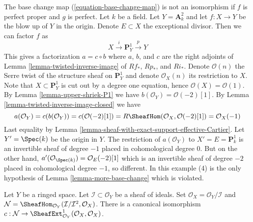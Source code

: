 \begin{example}
\label{example-base-change-wrong}
The base change map (\ref{equation-base-change-map}) is not an
isomorphism if $f$ is perfect proper and $g$ is perfect.
Let $k$ be a field. Let $Y = \mathbf{A}^2_k$ and let $f : X \to Y$
be the blow up of $Y$ in the origin. Denote $E \subset X$ the
exceptional divisor. Then we can factor $f$ as
$$
X \xrightarrow{i} \mathbf{P}^1_Y \xrightarrow{p} Y
$$
This gives a factorization $a = c \circ b$ where
$a$, $b$, and $c$ are the right adjoints of
Lemma \ref{lemma-twisted-inverse-image}
of $Rf_*$, $Rp_*$, and $Ri_*$. Denote $\mathcal{O}(n)$ the
Serre twist of the structure sheaf on $\mathbf{P}^1_Y$ and
denote $\mathcal{O}_X(n)$ its restriction to $X$.
Note that $X \subset \mathbf{P}^1_Y$ is cut out by
a degree one equation, hence $\mathcal{O}(X) = \mathcal{O}(1)$.
By Lemma \ref{lemma-upper-shriek-P1} we have
$b(\mathcal{O}_Y) = \mathcal{O}(-2)[1]$.
By Lemma \ref{lemma-twisted-inverse-image-closed}
we have
$$
a(\mathcal{O}_Y) = c(b(\mathcal{O}_Y)) =
c(\mathcal{O}(-2)[1]) =
R\SheafHom(\mathcal{O}_X, \mathcal{O}(-2)[1]) =
\mathcal{O}_X(-1)
$$
Last equality by Lemma \ref{lemma-sheaf-with-exact-support-effective-Cartier}.
Let $Y' = \Spec(k)$ be the origin in $Y$. The restriction of
$a(\mathcal{O}_Y)$ to $X' = E = \mathbf{P}^1_k$
is an invertible sheaf of degree $-1$ placed in cohomological
degree $0$. But on the other hand,
$a'(\mathcal{O}_{\Spec(k)}) = \mathcal{O}_E(-2)[1]$
which is an invertible sheaf of degree $-2$ placed in
cohomological degree $-1$, so different. In this example
(4) is the only hypothesis of Lemma \ref{lemma-more-base-change}
which is violated.
\end{example}

\begin{lemma}
\label{lemma-ext}
Let $Y$ be a ringed space. Let $\mathcal{I} \subset \mathcal{O}_Y$
be a sheaf of ideals. Set $\mathcal{O}_X = \mathcal{O}_Y/\mathcal{I}$ and
$\mathcal{N} =
\SheafHom_{\mathcal{O}_Y}(\mathcal{I}/\mathcal{I}^2, \mathcal{O}_X)$.
There is a canonical isomorphism
$c : \mathcal{N} \to
\SheafExt^1_{\mathcal{O}_Y}(\mathcal{O}_X, \mathcal{O}_X)
$.
\end{lemma}

